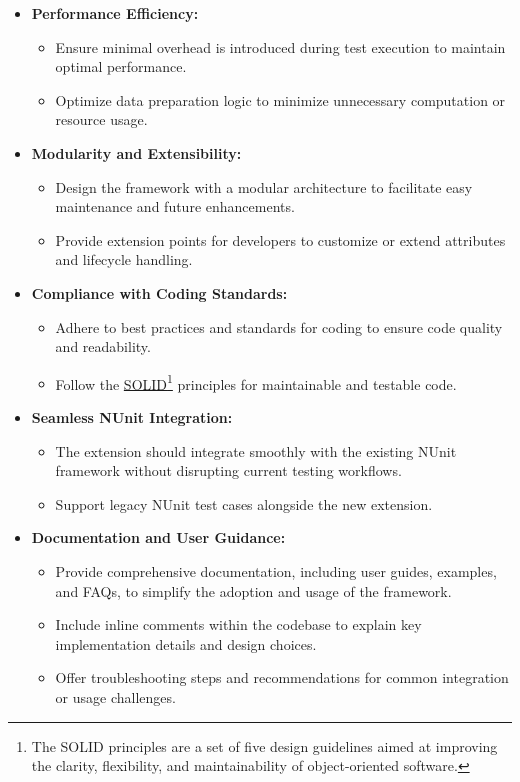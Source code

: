 \begin{itemize}
	\item \textbf{Performance Efficiency:}
	      \begin{itemize}
		      \item Ensure minimal overhead is introduced during test execution to maintain optimal performance.
		      \item Optimize data preparation logic to minimize unnecessary computation or resource usage.
	      \end{itemize}

	\item \textbf{Modularity and Extensibility:}
	      \begin{itemize}
		      \item Design the framework with a modular architecture to facilitate easy maintenance and future enhancements.
		      \item Provide extension points for developers to customize or extend attributes and lifecycle handling.
	      \end{itemize}

	\item \textbf{Compliance with Coding Standards:}
	      \begin{itemize}
		      \item Adhere to best practices and standards for coding to ensure code quality and readability.
		      \item Follow the \href{https://en.wikipedia.org/wiki/SOLID}{SOLID}\footnote{The SOLID principles are a set of five design guidelines aimed at improving the clarity, flexibility, and maintainability of object-oriented software.} principles for maintainable and testable code.
	      \end{itemize}

	\item \textbf{Seamless NUnit Integration:}
	      \begin{itemize}
		      \item The extension should integrate smoothly with the existing NUnit framework without disrupting current testing workflows.
		      \item Support legacy NUnit test cases alongside the new extension.
	      \end{itemize}
	\item \textbf{Documentation and User Guidance:}
	      \begin{itemize}
		      \item Provide comprehensive documentation, including user guides, examples, and FAQs, to simplify the adoption and usage of the framework.
		      \item Include inline comments within the codebase to explain key implementation details and design choices.
		      \item Offer troubleshooting steps and recommendations for common integration or usage challenges.
	      \end{itemize}
\end{itemize}


